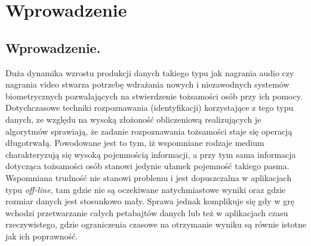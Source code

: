 \chapter{Wprowadzenie}

\section{Wprowadzenie.}

Duża dynamika wzrostu produkcji danych takiego typu jak nagrania audio czy nagrania video stwarza potrzebę wdrażania nowych i niezawodnych systemów biometrycznych pozwalających na stwierdzenie tożsamości osób przy ich pomocy. Dotychczasowe techniki rozpoznawania (identyfikacji) korzystające z tego typu danych, ze względu na wysoką złożoność obliczeniową realizujących je algorytmów sprawiają, że zadanie rozpoznawania tożsamości staje się operacją długotrwałą. Powodowane jest to tym, iż wspomniane rodzaje medium charakteryzują się wysoką pojemnością informacji, a przy tym sama informacja dotycząca tożsamości osób stanowi jedynie ułamek pojemność takiego pasma. Wspomniana trudność nie stanowi problemu i jest dopuszczalna w aplikacjach typu \textit{off-line}, tam gdzie nie są oczekiwane natychmiastowe wyniki oraz gdzie rozmiar danych jest stosunkowo mały. Sprawa jednak komplikuje się gdy w grę wchodzi przetwarzanie całych petabajtów danych lub też w aplikacjach czasu rzeczywistego, gdzie ograniczenia czasowe na otrzymanie wyniku są równie istotne jak ich poprawność.

